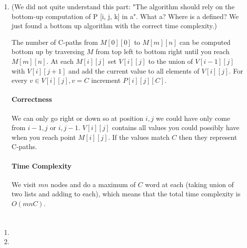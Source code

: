 \documentclass[12pt, a4paper]{article}
\begin{document}
\begin{enumerate}[a]
	\item %
	(We did not quite understand this part: "The algorithm should rely on the bottom-up computation of P [i, j, k] in a". What a? Where is a defined? We just found a bottom up algorithm with the correct time complexity.)

	The number of C-paths from $M[0][0]$ to $M[m][n]$ can be computed bottom up by traversing $M$ from top left to bottom right until you reach $M[m][n]$. At each $M[i][j]$ set $V[i][j]$ to the union of $V[i - 1][j]$ with $V[i][j + 1]$ and add the current value to all elements of $V[i][j]$. For every $v \in V[i][j], v = C$ increment $P[i][j][C]$.

	\paragraph{Correctness}

	We can only go right or down so at position $i, j$ we could have only come from $i - 1, j$ or $i, j - 1$. $V[i][j]$ contains all values you could possibly have when you reach point $M[i][j]$. If the values match $C$ then they represent C-paths.

	\paragraph{Time Complexity}

	We visit $mn$ nodes and do a maximum of $C$ word at each (taking union of two lists and adding to each), which means that the total time complexity is $O(mnC)$.

\end{enumerate}

\section{} %
\begin{enumerate}[a]
	\item %
	\item %
\end{enumerate}
\end{document}
